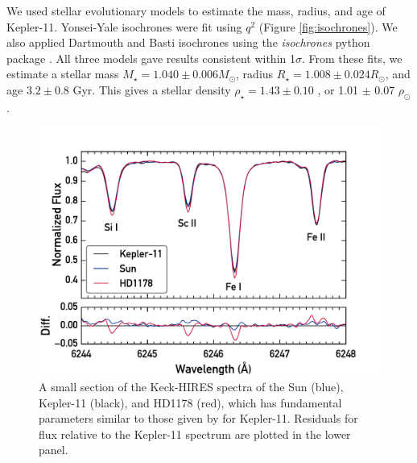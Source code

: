 \documentclass[oneside]{emulateapj}
\begin{document}
We used stellar evolutionary models to estimate the mass, radius, and age of Kepler-11. Yonsei-Yale isochrones were fit using $q^2$ (Figure \ref{fig:isochrones}). We also applied Dartmouth and Basti isochrones using the \textit{isochrones} python package \citep{Morton2015}. All three models gave results consistent within 1$\sigma$. From these fits, we estimate a stellar mass $M_{\star} = 1.040 \pm 0.006 M_{\odot}$, radius $R_{\star} = 1.008 \pm 0.024 R_{\odot}$, and age $3.2 \pm 0.8$ Gyr. This gives a stellar density $\rho_{\star} = 1.43 \pm 0.10$ \gcm, or 1.01 $\pm$ 0.07 $\rho_{\odot}$.  %

\begin{figure}
\centering
\includegraphics[width=\columnwidth]{spec}
\caption{A small section of the Keck-HIRES spectra of the Sun (blue), Kepler-11 (black), and HD1178 (red), which has fundamental parameters similar to those given by \citet{Lissauer2013} for Kepler-11. Residuals for flux relative to the Kepler-11 spectrum are plotted in the lower panel.}
\label{fig:spec}
\end{figure}
\end{document}
